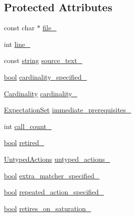 \subsection*{Protected Attributes}
\begin{DoxyCompactItemize}
\item 
const char $\ast$ \hyperlink{classtesting_1_1internal_1_1ExpectationBase_afabf690537298bbb84e9b443f62d7e97}{file\+\_\+}
\item 
int \hyperlink{classtesting_1_1internal_1_1ExpectationBase_ab8143119e4b686ff1bb6c985924da57a}{line\+\_\+}
\item 
const \hyperlink{namespacetesting_1_1internal_a8e8ff5b11e64078831112677156cb111}{string} \hyperlink{classtesting_1_1internal_1_1ExpectationBase_a8803b5fa8354205a6b57e21a704acbef}{source\+\_\+text\+\_\+}
\item 
\hyperlink{classbool}{bool} \hyperlink{classtesting_1_1internal_1_1ExpectationBase_ad2ca7220ed1a395bd850ff06c500a402}{cardinality\+\_\+specified\+\_\+}
\item 
\hyperlink{classtesting_1_1Cardinality}{Cardinality} \hyperlink{classtesting_1_1internal_1_1ExpectationBase_ad0aedcc01c0c9a998952a2b2f486595c}{cardinality\+\_\+}
\item 
\hyperlink{classtesting_1_1ExpectationSet}{Expectation\+Set} \hyperlink{classtesting_1_1internal_1_1ExpectationBase_a186eff0fdcacc8c1e1a2becdec11d3cd}{immediate\+\_\+prerequisites\+\_\+}
\item 
int \hyperlink{classtesting_1_1internal_1_1ExpectationBase_aea95d46f7583566e3f7a081b0668ad4c}{call\+\_\+count\+\_\+}
\item 
\hyperlink{classbool}{bool} \hyperlink{classtesting_1_1internal_1_1ExpectationBase_a0afd852f5d7863effc3d304dac6a44cf}{retired\+\_\+}
\item 
\hyperlink{classtesting_1_1internal_1_1ExpectationBase_a9b21e82059961b9f1198d3f5d518254f}{Untyped\+Actions} \hyperlink{classtesting_1_1internal_1_1ExpectationBase_a9558ff6b8b1b7e3a99fac1f93d1826da}{untyped\+\_\+actions\+\_\+}
\item 
\hyperlink{classbool}{bool} \hyperlink{classtesting_1_1internal_1_1ExpectationBase_a34f599ac7ae4f1fb7567e0d4c9fadcba}{extra\+\_\+matcher\+\_\+specified\+\_\+}
\item 
\hyperlink{classbool}{bool} \hyperlink{classtesting_1_1internal_1_1ExpectationBase_abecd382b79252ffc0779d51e058b681c}{repeated\+\_\+action\+\_\+specified\+\_\+}
\item 
\hyperlink{classbool}{bool} \hyperlink{classtesting_1_1internal_1_1ExpectationBase_a74802f3bedf4ab023b30ee6bb275a4d8}{retires\+\_\+on\+\_\+saturation\+\_\+}

\end{DoxyCompactItemize}
